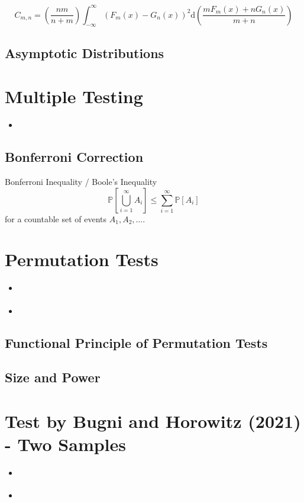 \documentclass[11pt,twoside,a4paper]{article}
\theoremstyle{assumpstyle} \newtheorem{assumption}{Assumption}
\theoremstyle{assumpstyle} \newtheorem{definition}{Definition}
\begin{document}
			\cite{buning_nichtparametrische_2013}
			\begin{equation}
				C_{m,n} = \left(\frac{nm}{n+m}\right) \int_{-\infty}^{\infty}\left(F_{m}(x) - G_{n}(x)\right)^{2} \mathrm{d} \left(\frac{m F_{m}(x) + n G_{n}(x)}{m+n}\right)
			\end{equation}
			
		
		\subsection{Asymptotic Distributions}
		
	\section{Multiple Testing}
		\begin{itemize}
			\item \cite{dunn_multiple_1961}
		\end{itemize}
	
		\subsection{Bonferroni Correction}	
			Bonferroni Inequality / Boole's Inequality
			\begin{equation}
				\mathbb{P}\left[\bigcup_{i = 1}^{\infty} A_i\right] \leq \sum_{i = 1}^{\infty} \mathbb{P}\left[A_i\right]
			\end{equation}
			for a countable set of events $A_1, A_2, \dots$.
		
	\section{Permutation Tests}
		\begin{itemize}
			\item \cite{lehmann_testing_2005}
			\item \cite{van_der_vaart_weak_1996}
		\end{itemize}
	
		\subsection{Functional Principle of Permutation Tests}
	
		\subsection{Size and Power}
		
	\section{Test by Bugni and Horowitz (2021) - Two Samples}
		\begin{itemize}
			\item \cite{bugni_permutation_2021}
			\item \cite{bugni_goodness--fit_2009}
		\end{itemize}
	
\end{document}
